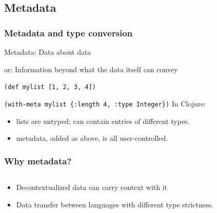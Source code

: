 \documentclass{beamer}
\newcommand{\linespace}{\vskip 0.25cm}
\begin{document}
\subsection{Metadata}

\begin{frame}
  \frametitle{Metadata and type conversion}

	Metadata: Data about data
	
	or: Information beyond what the data itself can convey
	
	{\tt (def mylist [1, 2, 3, 4])}
	
	{\tt (with-meta mylist \{:length 4, :type Integer\})}
	\linespace
	In Clojure:
	\begin{itemize}
	\item lists are untyped; can contain entries of different types.
	\item metadata, added as above, is all user-controlled.
	\end{itemize}
\end{frame}


\begin{frame}
    \frametitle{Why metadata?}
  \begin{columns}
  \begin{column}{0.5\textwidth}
    \begin{itemize}   
    \item Decontextualized data can carry context with it
    \item Data transfer between languages with different type strictness.
    \end{itemize}
  \end{column}
   
  \begin{column}{0.6\textwidth}

  \end{column}
  
  \end{columns}
\end{frame}
\end{document}
